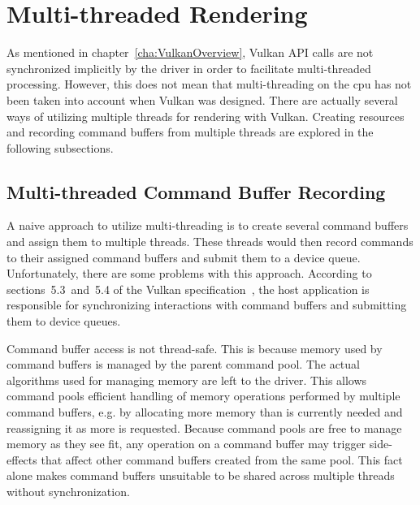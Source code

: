   \section{Multi-threaded Rendering}
  \label{sec:MultithreadedRendering}
    As mentioned in chapter~\ref{cha:VulkanOverview}, Vulkan API calls are not synchronized implicitly by the \gls{driver} in order to facilitate multi-threaded processing.
    However, this does not mean that multi-threading on the \gls{cpu} has not been taken into account when Vulkan was designed.
    There are actually several ways of utilizing multiple threads for rendering with Vulkan.
    Creating resources and recording command buffers from multiple threads are explored in the following subsections.

    \subsection{Multi-threaded Command Buffer Recording}
      A naive approach to utilize multi-threading is to create several command buffers and assign them to multiple threads.
      These threads would then record commands to their assigned command buffers and submit them to a device queue.
      Unfortunately, there are some problems with this approach.
      According to sections~5.3~and~5.4 of the Vulkan specification~\cite{vkspec}, the host application is responsible for synchronizing interactions with command buffers and submitting them to device queues.

      Command buffer access is not thread-safe.
      This is because memory used by command buffers is managed by the parent command pool.
      The actual algorithms used for managing memory are left to the \gls{driver}.
      This allows command pools efficient handling of memory operations performed by multiple command buffers, e.g. by allocating more memory than is currently needed and reassigning it as more is requested.
      Because command pools are free to manage memory as they see fit, any operation on a command buffer may trigger side-effects that affect other command buffers created from the same pool.
      This fact alone makes command buffers unsuitable to be shared across multiple threads without synchronization.


